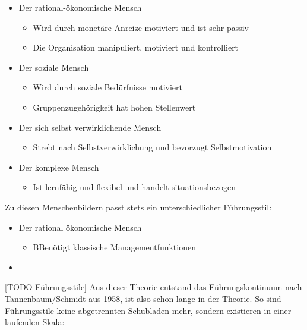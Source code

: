 \documentclass{article}
\begin{document}
	 \begin{itemize}
	 	\item{Der rational-ökonomische Mensch}
	 	\begin{itemize}
	 		\item{Wird durch monetäre Anreize motiviert und ist sehr passiv}
	 		\item{Die Organisation manipuliert, motiviert und kontrolliert}
	 	\end{itemize}
	 	\item{Der soziale Mensch}
	 	\begin{itemize}
	 		\item{Wird durch soziale Bedürfnisse motiviert}
	 		\item{Gruppenzugehörigkeit hat hohen Stellenwert}
	 	\end{itemize}
	 	\item{Der sich selbst verwirklichende Mensch}
	 	\begin{itemize}
	 		\item{Strebt nach Selbstverwirklichung und bevorzugt Selbstmotivation}
	 	\end{itemize}
	 	\item{Der komplexe Mensch}
	 	\begin{itemize}
	 		\item{Ist lernfähig und flexibel und handelt situationsbezogen}
	 	\end{itemize}
	 \end{itemize}
	 Zu diesen Menschenbildern passt stets ein unterschiedlicher Führungsstil:
	 \begin{itemize}
	 	\item{Der rational ökonomische Mensch}
	 	\begin{itemize}
	 		\item{BBenötigt klassische Managementfunktionen}
	 	\end{itemize}
	 	\item{}
	 \end{itemize}
	 [TODO Führungsstile]
	 Aus dieser Theorie entstand das Führungskontinuum nach Tannenbaum/Schmidt aus 1958, ist also schon lange in der Theorie. So sind Führungsstile keine abgetrennten Schubladen mehr, sondern existieren in einer laufenden Skala:
\end{document}
